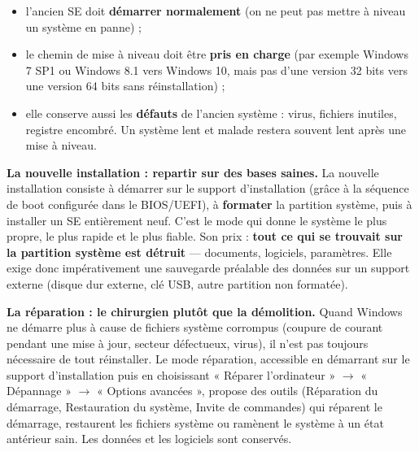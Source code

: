 \documentclass[11pt]{article}
\newcommand{\cle}[1]{{\popxbold\color{popdark}#1}}
\begin{document}
\begin{itemize}
\item l'ancien SE doit \textbf{démarrer normalement} (on ne peut pas mettre à niveau un système en panne) ;
\item le chemin de mise à niveau doit être \textbf{pris en charge} (par exemple Windows 7 SP1 ou Windows 8.1 vers Windows 10, mais pas d'une version 32 bits vers une version 64 bits sans réinstallation) ;
\item elle conserve aussi les \textbf{défauts} de l'ancien système : virus, fichiers inutiles, registre encombré. Un système lent et malade restera souvent lent après une mise à niveau.
\end{itemize}

\textbf{La nouvelle installation : repartir sur des bases saines.} La nouvelle installation consiste à démarrer sur le support d'installation (grâce à la séquence de boot configurée dans le BIOS/UEFI), à \textbf{formater} la partition système, puis à installer un SE entièrement neuf. C'est le mode qui donne le système le plus propre, le plus rapide et le plus fiable. Son prix : \textbf{tout ce qui se trouvait sur la partition système est détruit} — documents, logiciels, paramètres. Elle exige donc impérativement une \cle{sauvegarde préalable} des données sur un support externe (disque dur externe, clé USB, autre partition non formatée).

\textbf{La réparation : le chirurgien plutôt que la démolition.} Quand Windows ne démarre plus à cause de fichiers système corrompus (coupure de courant pendant une mise à jour, secteur défectueux, virus), il n'est pas toujours nécessaire de tout réinstaller. Le mode \cle{réparation}, accessible en démarrant sur le support d'installation puis en choisissant « Réparer l'ordinateur » $\rightarrow$ « Dépannage » $\rightarrow$ « Options avancées », propose des outils (Réparation du démarrage, Restauration du système, Invite de commandes) qui réparent le démarrage, restaurent les fichiers système ou ramènent le système à un état antérieur sain. Les données et les logiciels sont conservés.
\end{document}

